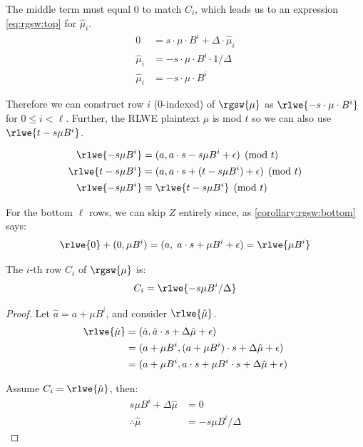 The middle term must equal 0 to match $C_i$, which leads us to an expression \eqref{eq:rgsw:top} for $\hat{\mu}_i$.
\begin{align}
    0 &= s\cdot \mu \cdot B^{i} + \Delta\cdot \hat{\mu}_i \\
    \hat{\mu}_i &= -s\cdot\mu\cdot B^{i} \cdot 1/\Delta \\
    \label{eq:rgsw:top}
    \hat{\mu}_i &= -s\cdot\mu\cdot B^{i}
\end{align}

Therefore we can construct row $i$ (0-indexed) of $\rgsw{\mu}$ as $\rlwe{-s\cdot\mu\cdot B^{i}}$ for $0 \leq i < \ell$. Further, the RLWE plaintext $\mu$ is mod $t$ so we can also use $\rlwe{t - s\mu B^{i}}$.

\begin{align*}
    \rlwe{-s\mu B^{i}} &= (a, a\cdot s - s\mu B^{i} + \epsilon) \pmod{t} \\
    \rlwe{t - s\mu B^{i}} &= (a, a\cdot s + (t - s\mu B^{i}) + \epsilon) \pmod{t} \\
    \rlwe{-s\mu B^{i}}  &\equiv \rlwe{t - s\mu B^{i}}   \pmod{t}
\end{align*}

For the bottom $\ell$ rows, we can skip $Z$ entirely since, as \autoref{corollary:rgsw:bottom} says:
$$\rlwe{0} + (0, \mu B^{i}) = (a,\; a\cdot s + \mu B^{i} + \epsilon) = \rlwe{\mu B^{i}}$$

\begin{lemma}
\label{lemma:rgsw:top}
The $i$-th row $C_i$ of $\rgsw{\mu}$ is:
\begin{equation}
    C_i = \rlwe{-s\mu B^{i}/\Delta}
\end{equation}

\begin{proof}
Let $\hat{a} = a + \mu B^i$, and consider $\rlwe{\hat{\mu}}$.
\begin{align*}
    \rlwe{\hat{\mu}} &= (\hat{a}, \hat{a}\cdot s + \Delta \hat{\mu} + \epsilon) \\
        &=(a + \mu B^i, (a + \mu B^i)\cdot s + \Delta \hat{\mu} + \epsilon) \\
        &=(a + \mu B^i, a\cdot s + \mu B^i\cdot s + \Delta\hat{\mu} + \epsilon)
\end{align*}

Assume $C_i = \rlwe{\hat{\mu}}$, then:
\begin{align*}
    s\mu B^i + \Delta\hat{\mu} &= 0 \\
    \therefore \hat{\mu} &= -s\mu B^i /\Delta
\end{align*}
\end{proof}
\end{lemma}

